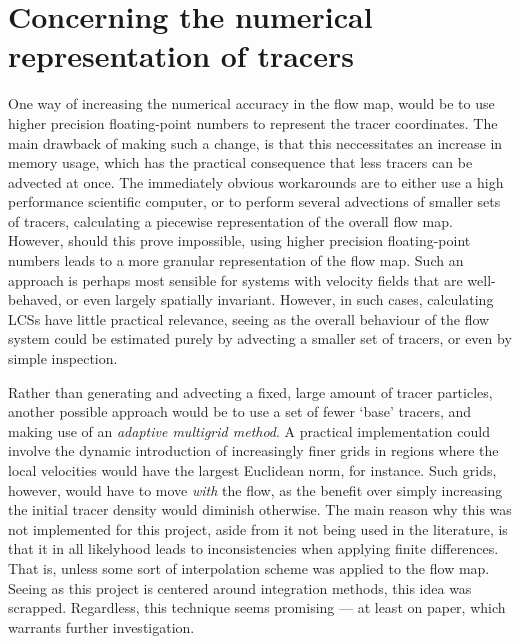 \section{Concerning the numerical representation of tracers}
\label{sec:concerning_the_numerical_representation_of_tracers}

One way of increasing the numerical accuracy in the flow map, would be
to use higher precision floating-point numbers to represent the tracer
coordinates. The main drawback of making such a change, is that this
neccessitates an increase in memory usage, which has the practical consequence
that less tracers can be advected at once. The immediately obvious workarounds
are to either use a high performance scientific computer, or to perform several
advections of smaller sets of tracers, calculating a piecewise representation
of the overall flow map. However, should this prove impossible, using higher
precision floating-point numbers leads to a more granular representation of the
flow map. Such an approach is perhaps most sensible for systems with velocity
fields that are well-behaved, or even largely spatially invariant. However,
in such cases, calculating LCSs have little practical relevance, seeing as
the overall behaviour of the flow system could be estimated purely by
advecting a smaller set of tracers, or even by simple inspection.

Rather than generating and advecting a fixed, large amount of tracer particles,
another possible approach would be to use a set of fewer `base' tracers, and
making use of an \emph{adaptive multigrid method}. A practical implementation
could involve the dynamic introduction of increasingly finer grids in regions
where the local velocities would have the largest Euclidean norm, for instance.
Such grids, however, would have to move \emph{with} the flow, as the
benefit over simply increasing the initial tracer density would diminish
otherwise. The main reason why this was not implemented for this project,
aside from it not being used in the literature, is that it in all likelyhood
leads to inconsistencies when applying finite differences. That is, unless some
sort of interpolation scheme was applied to the flow map. Seeing as this
project is centered around integration methods, this idea was scrapped.
Regardless, this technique seems promising --- at least on paper, which
warrants further investigation.
